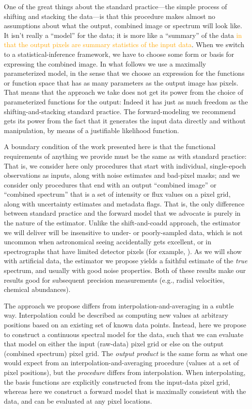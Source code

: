 \documentclass[modern, linenumbers]{aastex631}
\newcommand{\modified}[1]{\textcolor{orange}{#1}}
\begin{document}
One of the great things about the standard practice---the simple process of shifting and stacking the data---is that this procedure makes almost no assumptions about what the output, combined image or spectrum will look like.
It isn't really a ``model'' for the data; it is more like a ``summary'' of the data \modified{in that the output pixels are summary statistics of the input data}.
When we switch to a statistical-inference framework, we have to choose some form or basis for expressing the combined image.
In what follows we use a maximally parameterized model, in the sense that we choose an expression for the functions or function space that has as many parameters as the output image has pixels.
That means that the approach we take does not get its power from the choice of parameterized functions for the output:
Indeed it has just as much freedom as the shifting-and-stacking standard practice.
The forward-modeling we recommend gets its power from the fact that it generates the input data directly and without manipulation, by means of a justifiable likelihood function.

A boundary condition of the work presented here is that the functional requirements of anything we provide must be the same as with standard practice:
That is, we consider here only procedures that start with individual, single-epoch observations as inputs, along with noise estimates and bad-pixel masks; and we consider only procedures that end with an output ``combined image'' or ``combined spectrum'' that is a set of intensity or flux values on a pixel grid, along with uncertainty estimates and metadata flags.
That is, the only difference between standard practice and the forward model that we advocate is purely in the nature of the estimator.
Unlike the shift-and-coadd approach, the estimator we will deliver will be insensitive to under- or poorly-sampled data, which is not uncommon when astronomical seeing accidentally gets excellent, or in spectrographs that have limited detector pixels (for example, \citealt{apogeehardware}).
As we will show with artificial data, the estimator we propose yields a faithful estimate of the \emph{true} spectrum, and usually with good noise properties.
Both of these results make our results good for subsequent precision measurements (e.g., radial velocities, chemical abundances).

The approach we propose differs from interpolation-and-averaging in a subtle way. 
Interpolation could be described as computing new values at arbitrary positions based on an existing set of known data points. 
Instead, here we propose to construct a continuous spectral model for the data, such that we can evaluate that model on either the input (raw-data) pixel grid or else on the output (combined spectrum) pixel grid.
The \emph{output product} is the same form as what one would expect from an interpolation-and-averaging procedure (values at a set of pixel positions), but the \emph{procedure} differs from interpolation. When interpolating, the basis functions are explicitly constructed from the input-data pixel grid, whereas here we construct a forward model that is maximally consistent with the data, and can be evaluated at any pixel locations.
\end{document}
